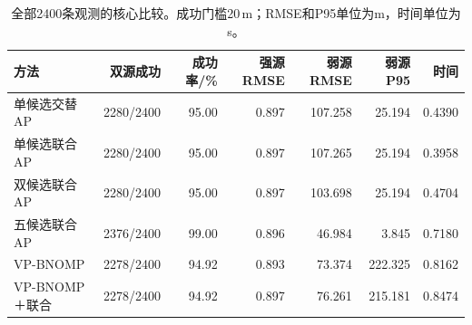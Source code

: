 \begin{table}[htbp]\centering\small
\caption{全部2400条观测的核心比较。成功门槛20\,m；RMSE和P95单位为m，时间单位为s。}\label{tab:formalcore}
\begin{tabular}{@{}lrrrrrr@{}}\toprule
方法 & 双源成功 & 成功率/\% & 强源RMSE & 弱源RMSE & 弱源P95 & 时间\\\midrule
单候选交替AP & 2280/2400 & 95.00 & 0.897 & 107.258 & 25.194 & 0.4390\\
单候选联合AP & 2280/2400 & 95.00 & 0.897 & 107.265 & 25.194 & 0.3958\\
双候选联合AP & 2280/2400 & 95.00 & 0.897 & 103.698 & 25.194 & 0.4704\\
五候选联合AP & 2376/2400 & 99.00 & 0.896 & 46.984 & 3.845 & 0.7180\\
VP-BNOMP & 2278/2400 & 94.92 & 0.893 & 73.374 & 222.325 & 0.8162\\
VP-BNOMP＋联合 & 2278/2400 & 94.92 & 0.897 & 76.261 & 215.181 & 0.8474\\
\bottomrule\end{tabular}\end{table}
